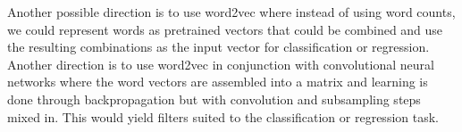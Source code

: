 \documentclass[a4paper]{llncs}
\begin{document}
Another possible direction is to use word2vec where instead of using word counts, we could represent words as pretrained vectors that could be combined and use the resulting combinations as the input vector for classification or regression. Another direction is to use word2vec in conjunction with convolutional neural networks where the word vectors are assembled into a matrix and learning is done through backpropagation but with convolution and subsampling steps mixed in. This would yield filters suited to the classification or regression task.





\end{document}
